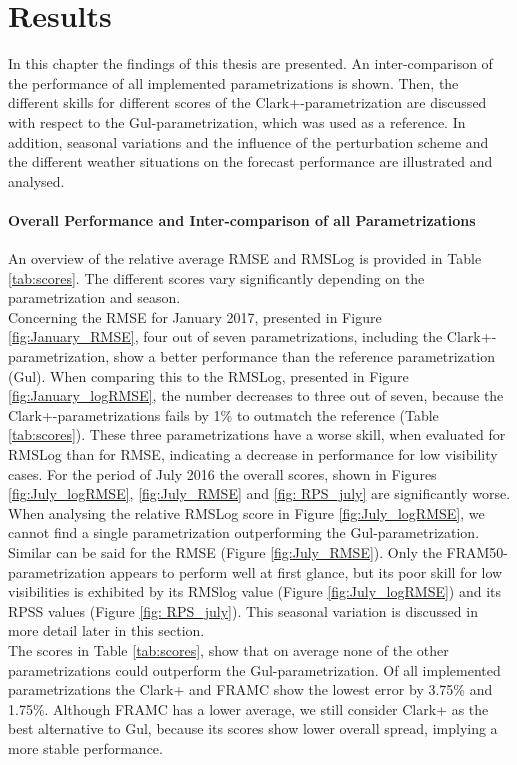 \chapter{Results}
\label{sec:results}
In this chapter the findings of this thesis are presented. An inter-comparison of the performance of all implemented parametrizations is shown. Then, the different skills for different scores of the Clark+-parametrization are discussed with respect to the Gul-parametrization, which was used as a reference. In addition, seasonal variations and the influence of the perturbation scheme and the different weather situations on the forecast performance are illustrated and analysed. 

\subsubsection{Overall Performance and Inter-comparison of all Parametrizations }
An overview of the relative average RMSE and RMSLog is provided in Table \ref{tab:scores}. The different scores vary significantly depending on the parametrization and season.\\
Concerning the RMSE for January 2017, presented in Figure \ref{fig:January_RMSE}, four out of seven parametrizations, including the Clark+-parametrization, show a better performance than the reference parametrization (Gul). When comparing this to the RMSLog, presented in Figure \ref{fig:January_logRMSE}, the number decreases to three out of seven, because the Clark+-parametrizations fails by 1\% to outmatch the reference (Table \ref{tab:scores}). These three parametrizations have a worse skill, when evaluated for RMSLog than for RMSE, indicating a decrease in performance for low visibility cases. For the period of July 2016 the overall scores, shown in Figures \ref{fig:July_logRMSE}, \ref{fig:July_RMSE} and \ref{fig: RPS_july} are significantly worse. When analysing the relative RMSLog score in Figure \ref{fig:July_logRMSE}, we cannot find a single parametrization outperforming the Gul-parametrization. Similar can be said for the RMSE (Figure \ref{fig:July_RMSE}). Only the FRAM50-parametrization appears to perform well at first glance, but its poor skill for low visibilities is exhibited by its RMSlog value (Figure \ref{fig:July_logRMSE}) and its RPSS values (Figure \ref{fig: RPS_july}). This seasonal variation is discussed in more detail later in this section.\\
The scores in Table \ref{tab:scores}, show that on average none of the other parametrizations could outperform the Gul-parametrization. Of all implemented parametrizations the Clark+ and FRAMC show the lowest error by 3.75\% and 1.75\%. Although FRAMC has a lower average, we still consider Clark+ as the best alternative to Gul, because its scores show lower overall spread, implying a more stable performance.
